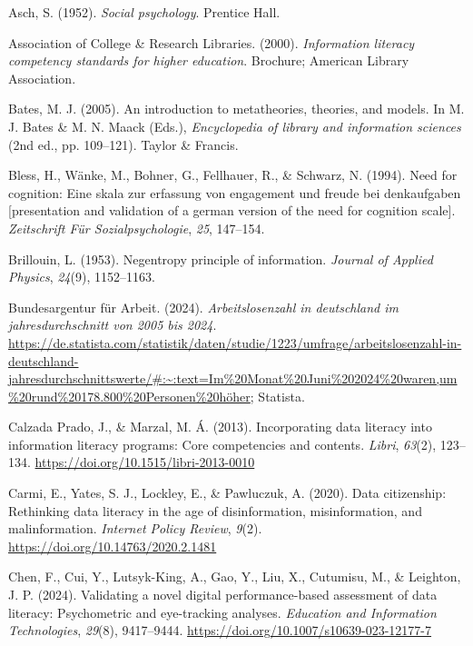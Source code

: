 \documentclass[
  12pt,
  a4paper,
  twoside]{article}
\newlength{\cslhangindent}
\newenvironment{CSLReferences}[2] %
 {\begin{list}{}{%
  \setlength{\itemindent}{0pt}
  \setlength{\leftmargin}{0pt}
  \setlength{\parsep}{0pt}
  \ifodd #1
   \setlength{\leftmargin}{\cslhangindent}
   \setlength{\itemindent}{-1\cslhangindent}
  \fi
  \setlength{\itemsep}{#2\baselineskip}}}
 {\end{list}}
\begin{document}
\label{refs}
\begin{CSLReferences}{1}{0}
Asch, S. (1952). \emph{Social psychology}. Prentice Hall.

Association of College \& Research Libraries. (2000). \emph{Information literacy competency standards for higher education}. Brochure; American Library Association.

Bates, M. J. (2005). An introduction to metatheories, theories, and models. In M. J. Bates \& M. N. Maack (Eds.), \emph{Encyclopedia of library and information sciences} (2nd ed., pp. 109--121). Taylor \& Francis.

Bless, H., Wänke, M., Bohner, G., Fellhauer, R., \& Schwarz, N. (1994). Need for cognition: Eine skala zur erfassung von engagement und freude bei denkaufgaben {[}presentation and validation of a german version of the need for cognition scale{]}. \emph{Zeitschrift Für Sozialpsychologie}, \emph{25}, 147--154.

Brillouin, L. (1953). Negentropy principle of information. \emph{Journal of Applied Physics}, \emph{24}(9), 1152--1163.

Bundesargentur für Arbeit. (2024). \emph{Arbeitslosenzahl in deutschland im jahresdurchschnitt von 2005 bis 2024}. \url{https://de.statista.com/statistik/daten/studie/1223/umfrage/arbeitslosenzahl-in-deutschland-jahresdurchschnittswerte/\#:~:text=Im\%20Monat\%20Juni\%202024\%20waren,um\%20rund\%20178.800\%20Personen\%20höher}; Statista.

Calzada Prado, J., \& Marzal, M. Á. (2013). Incorporating data literacy into information literacy programs: Core competencies and contents. \emph{Libri}, \emph{63}(2), 123--134. \url{https://doi.org/10.1515/libri-2013-0010}

Carmi, E., Yates, S. J., Lockley, E., \& Pawluczuk, A. (2020). Data citizenship: Rethinking data literacy in the age of disinformation, misinformation, and malinformation. \emph{Internet Policy Review}, \emph{9}(2). \url{https://doi.org/10.14763/2020.2.1481}

Chen, F., Cui, Y., Lutsyk-King, A., Gao, Y., Liu, X., Cutumisu, M., \& Leighton, J. P. (2024). Validating a novel digital performance-based assessment of data literacy: Psychometric and eye-tracking analyses. \emph{Education and Information Technologies}, \emph{29}(8), 9417--9444. \url{https://doi.org/10.1007/s10639-023-12177-7}


\end{CSLReferences}
\end{document}
